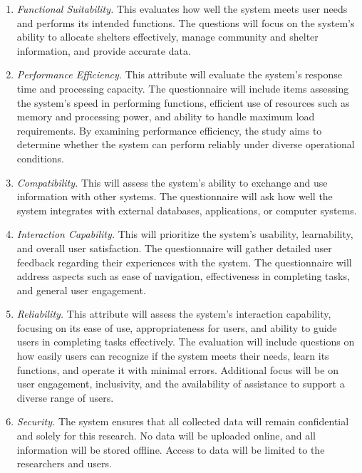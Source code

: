 	\begin{enumerate}
		\item \textit{Functional Suitability.} This evaluates how well the system meets user needs and performs its intended functions. The questions will focus on the system's ability to allocate shelters effectively, manage community and shelter information, and provide accurate data.
		
		\item \textit{Performance Efficiency.} This attribute will evaluate the system's response time and processing capacity. The questionnaire will include items assessing the system's speed in performing functions, efficient use of resources such as memory and processing power, and ability to handle maximum load requirements. By examining performance efficiency, the study aims to determine whether the system can perform reliably under diverse operational conditions.
		
		\item \textit{Compatibility.} This will assess the system’s ability to exchange and use information with other systems. The questionnaire will ask how well the system integrates with external databases, applications, or computer systems. 
		
		\item \textit{Interaction Capability.} This will prioritize the system's usability, learnability, and overall user satisfaction. The questionnaire will gather detailed user feedback regarding their experiences with the system. The questionnaire will address aspects such as ease of navigation, effectiveness in completing tasks, and general user engagement.
		
		\item \textit{Reliability.} This attribute will assess the system's interaction capability, focusing on its ease of use, appropriateness for users, and ability to guide users in completing tasks effectively. The evaluation will include questions on how easily users can recognize if the system meets their needs, learn its functions, and operate it with minimal errors. Additional focus will be on user engagement, inclusivity, and the availability of assistance to support a diverse range of users. 
		
		\item \textit{Security.} The system ensures that all collected data will remain confidential and solely for this research. No data will be uploaded online, and all information will be stored offline. Access to data will be limited to the researchers and users.
		

\end{enumerate}
